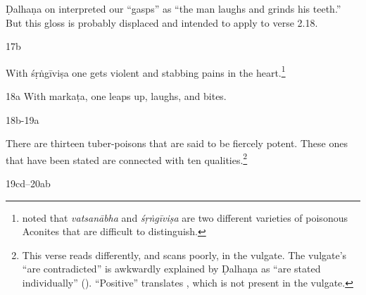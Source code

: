 \begin{translation}
{Ḍalhaṇa on  interpreted our “gasps” as “the man laughs 
and grinds his teeth.”  But this gloss is probably displaced and intended to 
apply to verse 2.18.}


\item[ 17b] 

With \gls{śṛṅgīviṣa}
one gets violent
 and stabbing pains in the 
heart.\footnote{\citet[407]{gvdb} noted that \emph{vatsanābha} and 
\emph{śṛṅgīviṣa} are two different varieties of poisonous Aconites that are 
difficult to distinguish.}
    
    \item[ 18a]
    With
    \gls{markaṭa}, one leaps up, laughs, and 
    bites.
    
    
    \item[ 18b-19a]
      
    There are thirteen tuber-poisons that are said to be fiercely
potent.  These ones that have been stated are connected with ten
 qualities.\footnote{This verse reads
    differently, and scans poorly, in the vulgate. The vulgate's
     “are contradicted” is awkwardly explained by
    Ḍalhaṇa as “are stated individually” (). “Positive” 
    translates , which is not present in the vulgate.}
    
    \item[19cd--20ab]
    

\end{translation}
